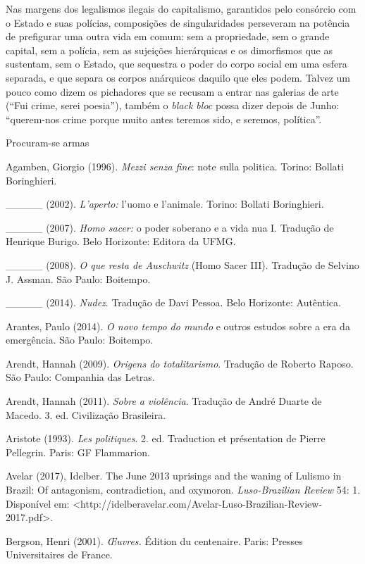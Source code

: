 Nas margens dos legalismos ilegais do capitalismo, garantidos pelo
consórcio com o Estado e suas polícias, composições de singularidades
perseveram na potência de prefigurar uma outra vida em comum: sem a
propriedade, sem o grande capital, sem a polícia, sem as sujeições
hierárquicas e os dimorfismos que as sustentam, sem o Estado, que
sequestra o poder do corpo social em uma esfera separada, e que separa
os corpos anárquicos daquilo que eles podem. Talvez um pouco como dizem
os pichadores que se recusam a entrar nas galerias de arte (``Fui crime,
serei poesia''), também o \emph{black bloc} possa dizer depois de Junho:
``querem-nos crime porque muito antes teremos sido, e seremos,
política''.

Procuram-se armas

Agamben, Giorgio (1996). \emph{Mezzi senza fine}: note sulla politica.
Torino: Bollati Boringhieri.

\_\_\_\_\_ (2002). \emph{L'aperto: }l'uomo e l'animale. Torino: Bollati
Boringhieri.

\_\_\_\_\_ (2007). \emph{Homo sacer: }o poder soberano e a vida nua I.
Tradução de Henrique Burigo. Belo Horizonte: Editora da UFMG.

\_\_\_\_\_ (2008). \emph{O que resta de Auschwitz} (Homo Sacer III).
Tradução de Selvino J. Assman. São Paulo: Boitempo.

\_\_\_\_\_ (2014). \emph{Nudez}. Tradução de Davi Pessoa. Belo
Horizonte: Autêntica.

Arantes, Paulo (2014). \emph{O novo tempo do mundo }e outros estudos
sobre a era da emergência. São Paulo: Boitempo.

Arendt, Hannah (2009). \emph{Origens do totalitarismo}. Tradução de
Roberto Raposo. São Paulo: Companhia das Letras.

Arendt, Hannah (2011). \emph{Sobre a violência}. Tradução de André
Duarte de Macedo. 3. ed. Civilização Brasileira.

Aristote (1993). \emph{Les politiques}. 2. ed. Traduction et
présentation de Pierre Pellegrin. Paris: GF Flammarion.

Avelar (2017), Idelber. The June 2013 uprisings and the waning of
Lulismo in Brazil: Of antagonism, contradiction, and oxymoron.
\emph{Luso-Brazilian Review} 54: 1. Disponível em:
\textless{}http://idelberavelar.com/Avelar-Luso-Brazilian-Review-2017.pdf\textgreater{}.

Bergson, Henri (2001). \emph{Œuvres. }Édition du centenaire. Paris:
Presses Universitaires de France.

